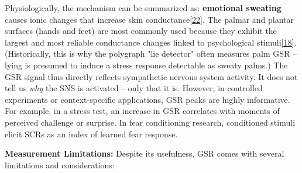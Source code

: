 \documentclass[12pt,a4paper]{article}
\begin{document}
Physiologically, the mechanism can be summarized as: \textbf{emotional sweating} causes ionic changes that increase skin conductance\href{https://imotions.com/blog/learning/research-fundamentals/galvanic-skin-response/\#:~:text=Whenever\%20sweat\%20glands\%20are\%20triggered,conductance\%20\%3D\%20decreased\%20skin\%20resistance}{{[}22{]}}. The palmar and plantar surfaces (hands and feet) are most commonly used because they exhibit the largest and most reliable conductance changes linked to psychological stimuli\href{https://imotions.com/blog/learning/research-fundamentals/galvanic-skin-response/\#:~:text=Our\%20body\%20has\%20about\%20three,the\%20sole\%20of\%20the\%20feet}{{[}18{]}}. (Historically, this is why the polygraph "lie detector" often measures palm GSR -- lying is presumed to induce a stress response detectable as sweaty palms.) The GSR signal thus directly reflects sympathetic nervous system activity. It does not tell us \emph{why} the SNS is activated -- only that it is. However, in controlled experiments or context-specific applications, GSR peaks are highly informative. For example, in a stress test, an increase in GSR correlates with moments of perceived challenge or surprise. In fear conditioning research, conditioned stimuli elicit SCRs as an index of learned fear response.

\textbf{Measurement Limitations:} Despite its usefulness, GSR comes with several limitations and considerations:
\end{document}
